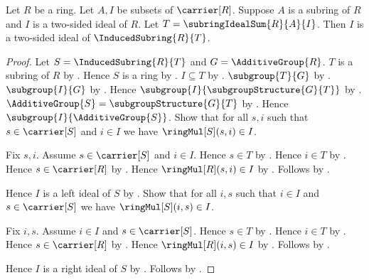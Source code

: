\begin{theorem}\label{ideal_in_subring_ideal_sum}
    Let $R$ be a ring.
    Let $A,I$ be subsets of $\carrier[R]$.
    Suppose $A$ is a subring of $R$ and $I$ is a two-sided ideal of $R$.
    Let $T=\subringIdealSum{R}{A}{I}$.
    Then $I$ is a two-sided ideal of $\InducedSubring{R}{T}$.
\end{theorem}
\begin{proof}
    Let $S=\InducedSubring{R}{T}$ and $G=\AdditiveGroup{R}$.
    $T$ is a subring of $R$ by .
    Hence $S$ is a ring by .
    $I\subseteq T$ by .
    $\subgroup{T}{G}$ by .
    $\subgroup{I}{G}$ by
        .
    Hence $\subgroup{I}{\subgroupStructure{G}{T}}$ by
        .
    $\AdditiveGroup{S}=\subgroupStructure{G}{T}$ by
        .
    Hence $\subgroup{I}{\AdditiveGroup{S}}$.
    Show that for all $s,i$ such that $s\in\carrier[S]$ and $i\in I$
        we have $\ringMul[S](s,i)\in I$.
    \begin{subproof}
        Fix $s,i$.
        Assume $s\in\carrier[S]$ and $i\in I$.
        Hence $s\in T$ by .
        Hence $i\in T$ by .
        Hence $s\in\carrier[R]$ by
            .
        Hence $\ringMul[R](s,i)\in I$ by
            .
        Follows by .
    \end{subproof}
    Hence $I$ is a left ideal of $S$ by
        .
    Show that for all $i,s$ such that $i\in I$ and $s\in\carrier[S]$
        we have $\ringMul[S](i,s)\in I$.
    \begin{subproof}
        Fix $i,s$.
        Assume $i\in I$ and $s\in\carrier[S]$.
        Hence $s\in T$ by .
        Hence $i\in T$ by .
        Hence $s\in\carrier[R]$ by
            .
        Hence $\ringMul[R](i,s)\in I$ by
            .
        Follows by .
    \end{subproof}
    Hence $I$ is a right ideal of $S$ by
        .
    Follows by .
\end{proof}

